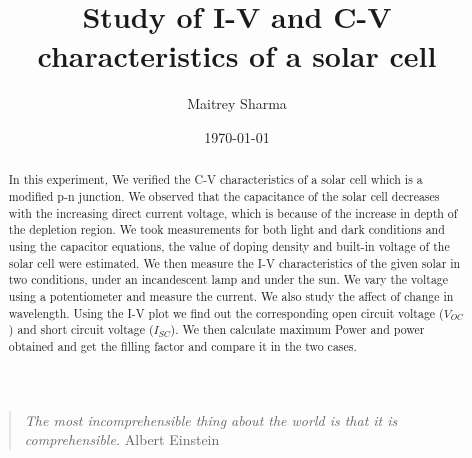 \documentclass[%
 aip,
 amsmath,amssymb,
 reprint, floatfix%
]{revtex4-2}
\begin{document}

\title[Study of I-V and C-V characteristics of a solar cell]{Study of I-V and C-V characteristics of a solar cell}
\author{Maitrey Sharma}

\date{\today}%

\begin{abstract}
In this experiment, We verified the C-V characteristics of a solar cell
which is a modified p-n junction. We observed that the capacitance of
the solar cell decreases with the increasing direct current voltage, which is
because of the increase in depth of the depletion region. We took measurements for both light and dark conditions and using the capacitor equations,
the value of doping density and built-in voltage of the solar cell were estimated. We then measure the I-V characteristics of the given solar
in two conditions, under an incandescent lamp and under the sun. We
vary the voltage using a potentiometer and measure the current. We also
study the affect of change in wavelength. Using the I-V plot we find out the
corresponding open circuit voltage ($V_{OC}$) and short circuit voltage ($I_{SC}$).
We then calculate maximum Power and power obtained and get the filling
factor and compare it in the two cases.
\end{abstract}

\maketitle 


\begin{quotation}
\textit{The most incomprehensible thing about the world is that it is comprehensible.}
\newline
\hspace*{0pt}\hfill Albert Einstein
\end{quotation}
\end{document}
